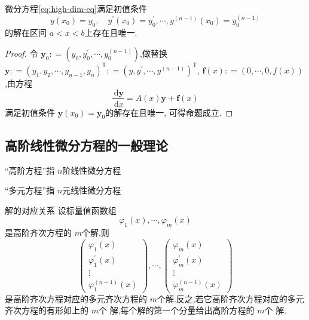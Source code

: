 \documentclass[lang=cn,12pt,color=green,fontset=none]{elegantbook}
\begin{document}
\begin{corollary}
    微分方程\ref{eq:high-dim-eq}满足初值条件 $$
    y\left( x_0 \right)=y_0,\quad  y^{\prime} \left( x_0 \right)=y_0^{\prime} ,\cdots ,y^{\left( n-1 \right) }\left( x_0 \right)=y_0^{\left( n-1 \right) }   
    $$的解在区间 $ a<x<b $上存在且唯一. 
\end{corollary}
\begin{proof}
    令 $ \mathbf{y}_{0}: = \left( y_0,y_0^{\prime},\cdots ,y_0^{\left( n-1 \right) } \right)  $,做替换 $\mathbf{y}: =  \left( y_1,y_2,\cdots ,y_{n-1},y_{n} \right)^{\mathsf{T}}: = \left( y,y^{\prime} ,\cdots ,y^{\left( n-1 \right) } \right)^{\mathsf{T}}   $, $ \mathbf{f}\left( x \right): = \left( 0,\cdots ,0,f\left( x \right)  \right)   $ ,由方程 $$
    \frac{\,\mathrm{d}  \mathbf{y} }{ \,\mathrm{d} x} = A\left( x \right) \mathbf{y}  +  \mathbf{f}\left( x \right) 
    $$满足初值条件 $ \mathbf{y} \left( x_0 \right) = \mathbf{y}_{0} $的解存在且唯一, 可得命题成立.  
\end{proof}

\subsection{高阶线性微分方程的一般理论}

\begin{introduction}[约定]
    \item “高阶方程”指 $ n $阶线性微分方程 
    \item “多元方程”指 $ n $元线性微分方程  
\end{introduction}

\begin{proposition}{解的对应关系}
    设标量值函数组
    \begin{equation}\label{eq:high-dim-sol}
        \varphi_{1}\left( x \right),\cdots ,\varphi _{m}\left( x \right)  
    \end{equation}
    是高阶齐次方程的 $ m $个解,则 
    \begin{equation}\label{eq:multy-var-sol}
        \begin{pmatrix} 
            \varphi_{1}\left( x \right)\\ 
             \varphi _{1}^{\prime} \left( x \right)\\ 
              \vdots \\ 
               \varphi _{1}^{\left( n-1 \right) }\left( x \right)    
        \end{pmatrix} ,\cdots ,\begin{pmatrix} 
            \varphi_{m}\left( x \right)\\ 
             \varphi _{m}^{\prime} \left( x \right)\\ 
              \vdots \\ 
               \varphi _{m}^{\left( n-1 \right) }\left( x \right)    
        \end{pmatrix}
    \end{equation} 是高阶齐次方程对应的多元齐次方程的 $ m $个解.反之,若它高阶齐次方程对应的多元齐次方程的有形如上的 $ m $个 解,每个解的第一个分量给出高阶方程的 $ m $个 解.   
\end{proposition}
\end{document}
